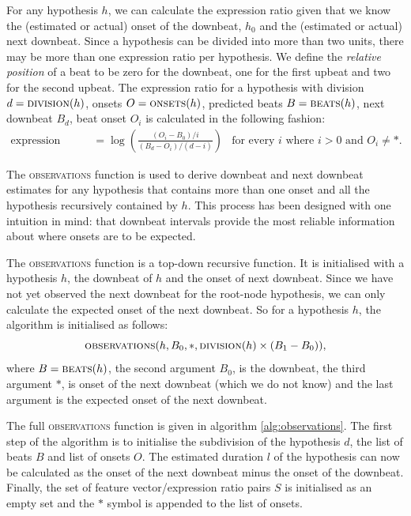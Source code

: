 For any hypothesis $h$, we can calculate the expression ratio given that we know the (estimated or actual) onset of the downbeat, $h_0$ and the (estimated or actual) next downbeat. Since a hypothesis can be divided into more than two units, there may be more than one expression ratio per hypothesis. We define the \textit{relative position} of a beat to be zero for the downbeat, one for the first upbeat and two for the second upbeat. The expression ratio for a hypothesis with division $d = \textsc{division}(h)$, onsets $O = \textsc{onsets}(h)$, predicted beats $B = \textsc{beats}(h)$, next downbeat $B_d$, beat onset $O_i$ is calculated in the following fashion:
\begin{align}
\label{eq:expression}
\mbox{expression ratio} &= \log\left(\frac{(O_i - B_0) / i}{(B_d - O_i) / (d - i)}\right) & \text{for every $i$ where $i > 0$ and $O_i \neq *$.}
\end{align}

The \textsc{observations} function is used to derive downbeat and next downbeat estimates for any hypothesis that contains more than one onset and all the hypothesis recursively contained by $h$. This process has been designed with one intuition in mind: that downbeat intervals provide the most reliable information about where onsets are to be expected. 

The \textsc{observations} function is a top-down recursive function. It is initialised with a hypothesis $h$, the downbeat of $h$ and the onset of next downbeat. Since we have not yet observed the next downbeat for the root-node hypothesis, we can only calculate the expected onset of the next downbeat. So for a hypothesis $h$, the algorithm is initialised as follows: 
\[\textsc{observations}(h, B_0, *, \textsc{division}(h) \times (B_1 - B_0)),\]
where $B = \textsc{beats}(h)$, the second argument $B_0$, is the downbeat, the third argument $*$, is onset of the next downbeat (which we do not know) and the last argument is the expected onset of the next downbeat.

The full \textsc{observations} function is given in algorithm \ref{alg:observations}. The first step of the algorithm is to initialise the subdivision of the hypothesis $d$, the list of beats $B$ and list of onsets $O$. The estimated duration $l$ of the hypothesis can now be calculated as the onset of the next downbeat minus the onset of the downbeat. Finally, the set of feature vector/expression ratio pairs $S$ is initialised as an empty set and the $*$ symbol is appended to the list of onsets.

